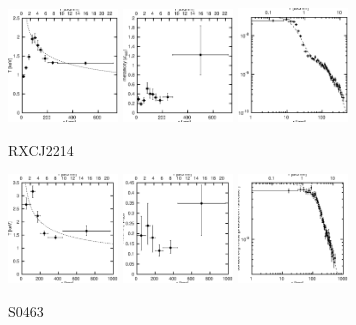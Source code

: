 \documentclass[structabstract]{aa}
\begin{document}
\begin{figure}[h]
   \centering
   \includegraphics[width=0.26\textwidth]{tprofile_rxcj2214.eps}
   \includegraphics[width=0.26\textwidth]{zprofile_rxcj2214.eps}
   \includegraphics[width=0.26\textwidth]{sbps_rxcj2214.eps}
   \caption{RXCJ2214}
   \label{fig:tprofrxcj2214}%
\end{figure}
\begin{figure}[h]
   \centering
   \includegraphics[width=0.26\textwidth]{tprofile_s0463.eps}
   \includegraphics[width=0.26\textwidth]{zprofile_s0463.eps}
   \includegraphics[width=0.26\textwidth]{sbps_s0463.eps}
   \caption{S0463}
   \label{fig:tprofs0463}%
\end{figure}
\end{document}
